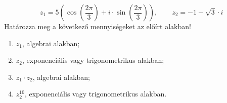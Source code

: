 \documentclass[11pt]{scrartcl}
\begin{document}
\[
	z_1 = 5 \left(
	\cos\left(\frac{2\pi}{3}\right) + i \cdot \sin\left(\frac{2\pi}{3}\right)
	\right), \qquad
	z_2 = -1 - \sqrt{3} \cdot i
\]
Határozza meg a következő mennyiségeket az előírt alakban!
\begin{enumerate}
	\item $z_1$, algebrai alakban;

	\item $z_2$, exponenciális vagy trigonometrikus alakban;

	\item $z_1 \cdot z_2$, algebrai alakban;

	\item $z_2^{10}$, exponenciális vagy trigonometrikus alakban.
\end{enumerate}
\end{document}
